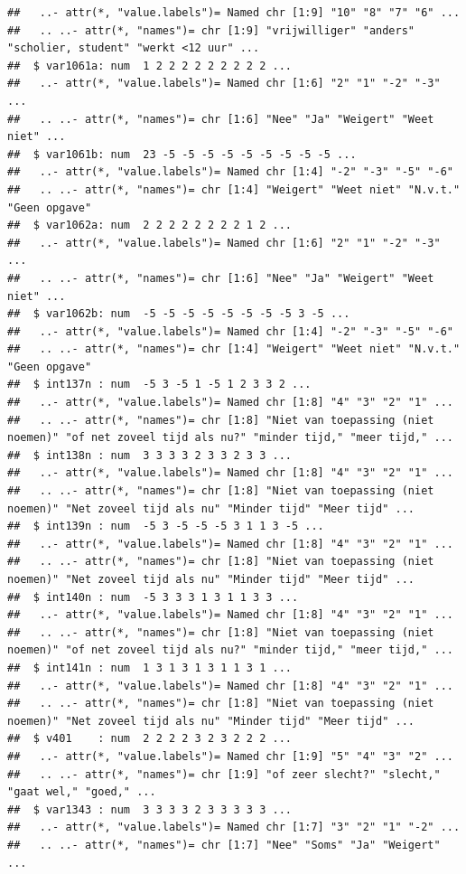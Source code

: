 \documentclass[
]{book}
\begin{document}
\begin{verbatim}
##   ..- attr(*, "value.labels")= Named chr [1:9] "10" "8" "7" "6" ...
##   .. ..- attr(*, "names")= chr [1:9] "vrijwilliger" "anders" "scholier, student" "werkt <12 uur" ...
##  $ var1061a: num  1 2 2 2 2 2 2 2 2 2 ...
##   ..- attr(*, "value.labels")= Named chr [1:6] "2" "1" "-2" "-3" ...
##   .. ..- attr(*, "names")= chr [1:6] "Nee" "Ja" "Weigert" "Weet niet" ...
##  $ var1061b: num  23 -5 -5 -5 -5 -5 -5 -5 -5 -5 ...
##   ..- attr(*, "value.labels")= Named chr [1:4] "-2" "-3" "-5" "-6"
##   .. ..- attr(*, "names")= chr [1:4] "Weigert" "Weet niet" "N.v.t." "Geen opgave"
##  $ var1062a: num  2 2 2 2 2 2 2 2 1 2 ...
##   ..- attr(*, "value.labels")= Named chr [1:6] "2" "1" "-2" "-3" ...
##   .. ..- attr(*, "names")= chr [1:6] "Nee" "Ja" "Weigert" "Weet niet" ...
##  $ var1062b: num  -5 -5 -5 -5 -5 -5 -5 -5 3 -5 ...
##   ..- attr(*, "value.labels")= Named chr [1:4] "-2" "-3" "-5" "-6"
##   .. ..- attr(*, "names")= chr [1:4] "Weigert" "Weet niet" "N.v.t." "Geen opgave"
##  $ int137n : num  -5 3 -5 1 -5 1 2 3 3 2 ...
##   ..- attr(*, "value.labels")= Named chr [1:8] "4" "3" "2" "1" ...
##   .. ..- attr(*, "names")= chr [1:8] "Niet van toepassing (niet noemen)" "of net zoveel tijd als nu?" "minder tijd," "meer tijd," ...
##  $ int138n : num  3 3 3 3 2 3 3 2 3 3 ...
##   ..- attr(*, "value.labels")= Named chr [1:8] "4" "3" "2" "1" ...
##   .. ..- attr(*, "names")= chr [1:8] "Niet van toepassing (niet noemen)" "Net zoveel tijd als nu" "Minder tijd" "Meer tijd" ...
##  $ int139n : num  -5 3 -5 -5 -5 3 1 1 3 -5 ...
##   ..- attr(*, "value.labels")= Named chr [1:8] "4" "3" "2" "1" ...
##   .. ..- attr(*, "names")= chr [1:8] "Niet van toepassing (niet noemen)" "Net zoveel tijd als nu" "Minder tijd" "Meer tijd" ...
##  $ int140n : num  -5 3 3 3 1 3 1 1 3 3 ...
##   ..- attr(*, "value.labels")= Named chr [1:8] "4" "3" "2" "1" ...
##   .. ..- attr(*, "names")= chr [1:8] "Niet van toepassing (niet noemen)" "of net zoveel tijd als nu?" "minder tijd," "meer tijd," ...
##  $ int141n : num  1 3 1 3 1 3 1 1 3 1 ...
##   ..- attr(*, "value.labels")= Named chr [1:8] "4" "3" "2" "1" ...
##   .. ..- attr(*, "names")= chr [1:8] "Niet van toepassing (niet noemen)" "Net zoveel tijd als nu" "Minder tijd" "Meer tijd" ...
##  $ v401    : num  2 2 2 2 3 2 3 2 2 2 ...
##   ..- attr(*, "value.labels")= Named chr [1:9] "5" "4" "3" "2" ...
##   .. ..- attr(*, "names")= chr [1:9] "of zeer slecht?" "slecht," "gaat wel," "goed," ...
##  $ var1343 : num  3 3 3 3 2 3 3 3 3 3 ...
##   ..- attr(*, "value.labels")= Named chr [1:7] "3" "2" "1" "-2" ...
##   .. ..- attr(*, "names")= chr [1:7] "Nee" "Soms" "Ja" "Weigert" ...

\end{verbatim}
\end{document}

